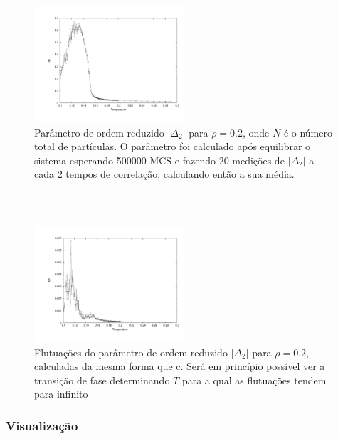 \documentclass[11pt]{beamer}
\begin{document}
\begin{frame}
\frametitle{\insertsection \\ {\small \insertsubsection}}
\begin{figure}
	\centering
		\includegraphics[width=0.5\textwidth, clip, trim = 1.7cm 1.5cm 1cm 1cm]{images/0.2/d2}
	\caption{{\footnotesize Parâmetro de ordem reduzido $|\Delta_2|$ para $\rho = 0.2$, onde $N$ é o número total de partículas. O parâmetro foi calculado após equilibrar o sistema esperando 500000 MCS e fazendo 20 medições de $|\Delta_2|$ a cada 2 tempos de correlação, calculando então a sua média.}}
	\label{fig:19}
\end{figure}
\end{frame}

\begin{frame}
\frametitle{\insertsection \\ {\small \insertsubsection}}
\begin{figure}
	\centering
		\includegraphics[width=0.5\textwidth, clip, trim = 1.7cm 1.5cm 1cm 1cm]{images/0.2/d2f}
	\caption{{\footnotesize Flutuações do parâmetro de ordem reduzido $|\Delta_2|$ para $\rho = 0.2$, calculadas da mesma forma que c. Será em princípio possível ver a transição de fase determinando $T$ para a qual as flutuações tendem para infinito}}
	\label{fig:20}
\end{figure}
\end{frame}

\subsubsection{Visualização}
\end{document}
